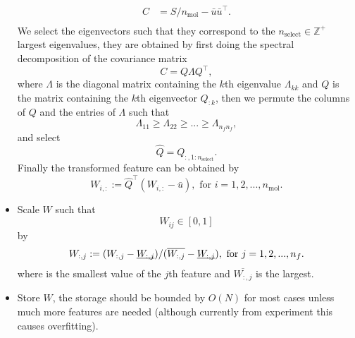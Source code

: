 \documentclass[12pt]{article}
\begin{document}
\begin{itemize}
\begin{equation}
\begin{split}
				C &= S/n_\text{mol} - \bar{u}\bar{u}^\top. \\			
			\end{split}
		\end{equation}
		We select the eigenvectors such that they correspond to the $n_\text{select} \in \mathbb{Z}^+$ largest eigenvalues, they are obtained by first doing the spectral decomposition of the covariance matrix
		\begin{equation}
			C = Q\Lambda Q^\top,
		\end{equation}
		where $\Lambda$ is the diagonal matrix containing the $k$th eigenvalue $\Lambda_{kk}$ and $Q$ is the matrix containing the $k$th eigenvector $Q_{:k}$, then we permute the columns of $Q$ and the entries of $\Lambda$ such that
		\begin{equation}
			\Lambda_{11} \geq \Lambda_{22} \geq  ... \geq \Lambda_{n_fn_f},
		\end{equation}
		and select
		\begin{equation}
			\hat{Q} = Q_{:, 1:n_\text{select}}.
		\end{equation}
		Finally the transformed feature can be obtained by
		\begin{equation}
			W_{i,:} := \hat{Q}^\top(W_{i,:} - \bar{u}), \text{ for }i = 1,2,...,n_\text{mol}.
		\end{equation}
	\item Scale $W$ such that 
	\begin{equation}
		W_{ij} \in [0, 1]
	\end{equation}
	by
	\begin{equation}
		\begin{split}
			W_{:,j} := (W_{:,j} - \underbar{$W_{:,j}$})/ (\overline{W_{:,j}} - \underbar{$W_{:,j}$}), \text{ for } j = 1,2,..., n_f.
		\end{split}
	\end{equation}
	where  is the smallest value of the $j$th feature and $\overline{W_{:,j}}$ is the largest.
	\item Store $W$, the storage should be bounded by $O(N)$ for most cases unless much more features are needed (although currently from experiment this causes overfitting).
\end{itemize}
\end{document}
